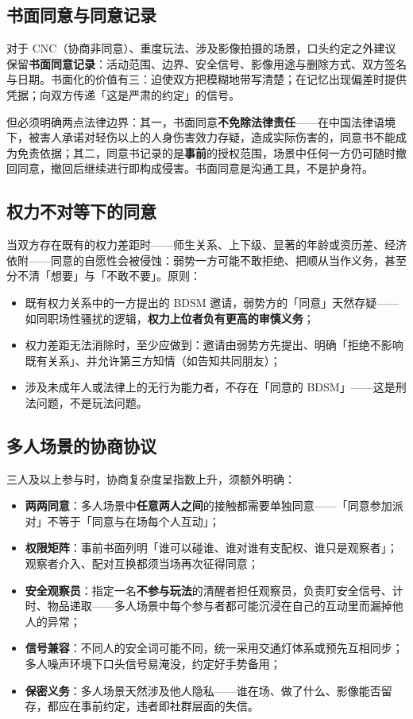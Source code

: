 \documentclass[12pt,UTF8]{ctexbook}
\begin{document}
\subsection{书面同意与同意记录}

对于 CNC（协商非同意）、重度玩法、涉及影像拍摄的场景，口头约定之外建议保留\textbf{书面同意记录}：活动范围、边界、安全信号、影像用途与删除方式、双方签名与日期。书面化的价值有三：迫使双方把模糊地带写清楚；在记忆出现偏差时提供凭据；向双方传递「这是严肃的约定」的信号。

但必须明确两点法律边界：其一，书面同意\textbf{不免除法律责任}——在中国法律语境下，被害人承诺对轻伤以上的人身伤害效力存疑，造成实际伤害的，同意书不能成为免责依据；其二，同意书记录的是\textbf{事前}的授权范围，场景中任何一方仍可随时撤回同意，撤回后继续进行即构成侵害。书面同意是沟通工具，不是护身符。

\subsection{权力不对等下的同意}

当双方存在既有的权力差距时——师生关系、上下级、显著的年龄或资历差、经济依附——同意的自愿性会被侵蚀：弱势一方可能不敢拒绝、把顺从当作义务，甚至分不清「想要」与「不敢不要」。原则：

\begin{itemize}
\item 既有权力关系中的一方提出的 BDSM 邀请，弱势方的「同意」天然存疑——如同职场性骚扰的逻辑，\textbf{权力上位者负有更高的审慎义务}；
\item 权力差距无法消除时，至少应做到：邀请由弱势方先提出、明确「拒绝不影响既有关系」、并允许第三方知情（如告知共同朋友）；
\item 涉及未成年人或法律上的无行为能力者，不存在「同意的 BDSM」——这是刑法问题，不是玩法问题。
\end{itemize}

\subsection{多人场景的协商协议}

三人及以上参与时，协商复杂度呈指数上升，须额外明确：

\begin{itemize}
\item \textbf{两两同意}：多人场景中\textbf{任意两人之间}的接触都需要单独同意——「同意参加派对」不等于「同意与在场每个人互动」；
\item \textbf{权限矩阵}：事前书面列明「谁可以碰谁、谁对谁有支配权、谁只是观察者」；观察者介入、配对互换都须当场再次征得同意；
\item \textbf{安全观察员}：指定一名\textbf{不参与玩法}的清醒者担任观察员，负责盯安全信号、计时、物品递取——多人场景中每个参与者都可能沉浸在自己的互动里而漏掉他人的异常；
\item \textbf{信号兼容}：不同人的安全词可能不同，统一采用交通灯体系或预先互相同步；多人噪声环境下口头信号易淹没，约定好手势备用；
\item \textbf{保密义务}：多人场景天然涉及他人隐私——谁在场、做了什么、影像能否留存，都应在事前约定，违者即社群层面的失信。
\end{itemize}
\end{document}
